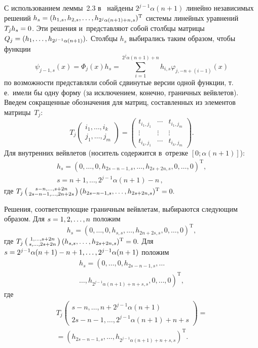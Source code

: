 \begin{multicols}{2}
С использованием леммы~2.3  в~\cite{Yurgu} найдены $2^{j-1}\alpha (n+1)$ 
линейно независимых решений ${h}_s\hm=
(h_{1,s},h_{2,s},\dots,h_{2^j\alpha (n+1)+n,s})^{\mathrm{T}}$ 
системы линейных уравнений  ${T}_j {h}_s\hm=0$. 
Эти решения и~представляют собой столбцы матрицы ${Q}_j\hm=
({h}_1,\dots,{h}_{2^{j-1}\alpha (n+1)}).$
Столбцы ${h}_{s} $ выбирались таким образом, чтобы функции
$$
\psi _{j-1,s} (x)=\Phi_j(x){h}_s=
\sum\limits_{i=1}^{2^{j} \alpha (n+1)+n}h_{i,s}  \varphi _{j,-n+(i-1)}(x)
$$
по возможности представляли собой сдвинутые версии одной функции, т.\,е.\ 
имели бы одну форму (за исключением, конечно, граничных вейвлетов).  
Введем сокращенные обозначения для матриц, составленных из элементов
 матрицы~${T}_j$:
$$
T_j\left(\begin{smallmatrix} 
i_1,\dots,i_k \\ j_1,\dots,j_m \end{smallmatrix} 
\right) = 
\begin{pmatrix} t_{i_1,j_1} & \cdots & t_{i_1,j_m} \\ 
\vdots & \vdots&\vdots \\ 
t_{i_k,j_1} & \cdots & t_{i_k,j_m} 
\end{pmatrix}.
$$
Для внутренних вейвлетов (носитель содержится в~отрезке $[0;\alpha (n+1)]$):
\begin{multline*}
{h}_s=(0,\dots,0,h_{2s-n-1,s},\dots, h_{2s+2n,s},0,\dots,0)^{\mathrm{T}},
\\
 s=n+1,\dots,2^{j-1}\alpha (n+1)-n\,,
\end{multline*}
 где $ T_j\left(\begin{smallmatrix} s-n,\dots,s+2n \\ 
 2s-n-1,\dots,2n+2s \end{smallmatrix} \right)(h_{2s-n-1,s},\dots,h_{2s+2n,s})^{\mathrm{T}}\hm=0.$

Решения, соответствующие граничным вейвлетам, выбираются следующим образом. 
Для $s\hm=1,2,\dots,n$ положим
$$
{h}_{s}=(0,\dots,0,h_{s,s},\dots,h_{2n+2s,s},0,\dots,0)^{\mathrm{T}},
$$
где $T_j\left(\begin{smallmatrix} 1,\dots,s+2n \\ 
s,\dots,2s+2n\end{smallmatrix} \right)(h_{s,s},\dots,h_{2s+2n,s})^{\mathrm{T}}\hm=0.$
Для $s\hm=2^{j-1}\alpha (n+1)\hm-n+1,\dots ,2^{j-1}\alpha (n+1)$ положим 
\begin{multline*}
{h}_{s}=\left(
0,\dots,0,h_{2s-n-1,s},\dots\right.\\
\left.\dots,h_{2^{j-1}\alpha (n+1)+n+s,s},0,
\dots,0\right)^{\mathrm{T}},
\end{multline*}
где
\begin{multline*}
T_j\left(\begin{smallmatrix} 
s-n,\dots,n+2^{j-1}\alpha (n+1) \\ 2s-n-1,\dots,2^{j-1}\alpha (n+1)+n+s 
\end{smallmatrix} \right)={}\\
{}=\left(h_{2s-n-1,s},\dots,h_{2^{j-1}\alpha (n+1)+n+s,s}\right)^{\mathrm{T}}.
\end{multline*}


\end{multicols}
